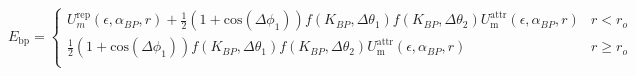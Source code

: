 \documentclass[12pt]{article}
\begin{document}
$$
E_\text{bp} = 
\begin{cases}
{U}_{m}^{\text{rep}} (\epsilon,{\alpha_{BP}},r) +  \frac{1}{2}(1+\text{cos}(\Delta {\phi}_{1})) f( {K}_{BP},\Delta \theta_{\text{1}})f( K_{BP},\Delta {\theta}_{2}) U_\text{m}^\text{attr}(\epsilon,{\alpha_{BP}},r) & r < r_{o}\\
\frac{1}{2}(1+\text{cos}(\Delta {\phi}_{1})) f( {K}_{BP},\Delta {\theta}_{1})f( {K}_{BP},\Delta {\theta}_{2}) U_\text{m}^\text{attr}(\epsilon,{\alpha_{BP}},r) & r \geq r_{o} \\
\end{cases}
$$
\end{document}
